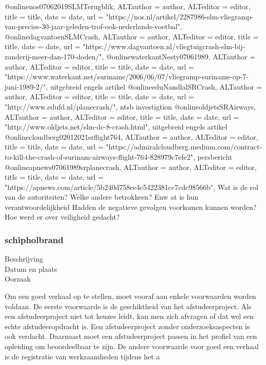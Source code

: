 {{@online{nos07062019SLMTerugblik,	ALTauthor = {author},	ALTeditor = {editor},	title = {title},	date = {date},	url = {"https://nos.nl/artikel/2287986-slm-vliegramp-van-precies-30-jaar-geleden-trof-ook-nederlands-voetbal"},}
@online{dagvantoenSLMCrash,	ALTauthor = {author},	ALTeditor = {editor},	title = {title},	date = {date},	url = {"https://www.dagvantoen.nl/vliegtuigcrash-slm-bij-zanderij-meer-dan-170-doden/"},}
@online{waterkantNesty07061989,	ALTauthor = {author},	ALTeditor = {editor},	title = {title},	date = {date},	url = {"https://www.waterkant.net/suriname/2006/06/07/vliegramp-suriname-op-7-juni-1989-2/"},}
uitgebreid engels artikel
@online{eduNandlalSRCrash,	ALTauthor = {author},	ALTeditor = {editor},	title = {title},	date = {date},	url = {"http://www.edufd.nl/planecrash/"},}
ntsb investigtion
@online{oldjetsSRAirways,	ALTauthor = {author},	ALTeditor = {editor},	title = {title},	date = {date},	url = {"http://www.oldjets.net/slm-dc-8-crash.html"},}
uitgebreid engels artikel
@online{cloudberg02012021srflight764,	ALTauthor = {author},	ALTeditor = {editor},	title = {title},	date = {date},	url = {"https://admiralcloudberg.medium.com/contract-to-kill-the-crash-of-surinam-airways-flight-764-828979c7efe2"},}
persbericht
@online{apnews07061989srplanecrash,	ALTauthor = {author},	ALTeditor = {editor},	title = {title},	date = {date},	url = {"https://apnews.com/article/5b240d758ee4c5422381cc7cdc98566b"},}
Wat is de rol van de autoriteiten?
Welke andere betrokkeen? Enw at is hun verantwoordelijkheid
Hadden de negatieve gevolgen voorkomen kunnen worden?
Hoe werd er over veiligheid gedacht?



\subsubsection{schipholbrand}

\begin{description}
\item[Beschrijving]
\item[Datum en plaats] 
\item[Oorzaak]
\end{description}
Om een goed verhaal op te stellen, moet vooraf aan enkele voorwaarden
worden voldaan. De eerste voorwaarde is de geschiktheid van het
afstudeerproject. Als een afstudeerproject niet tot keuzes leidt, kan
men zich afvragen of dat wel een echte afstudeeropdracht is. Een
afstudeerproject zonder onderzoeksaspecten is ook verdacht. Daarnaast
moet een afstudeerproject passen in het profiel van een opleiding om
beoordeelbaar te zijn. De andere voorwaarde voor goed een verhaal is
de registratie van werkzaamheden tijdens het a


}}

